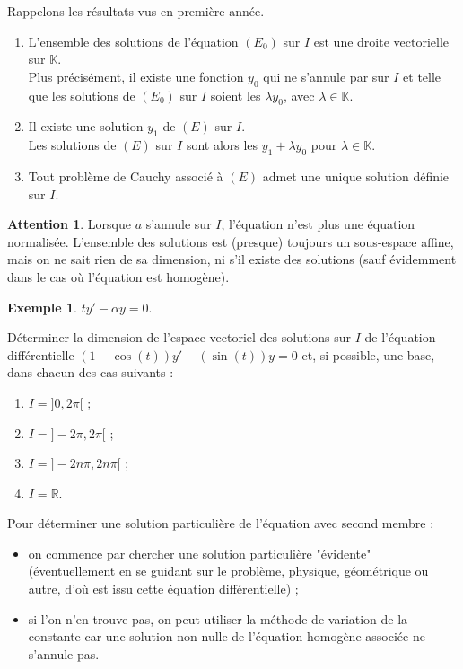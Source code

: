 \documentclass[french]{article}
\newcommand{\R}{\mathbb{R}}
\newcommand{\K}{\mathbb{K}}
\theoremstyle{plain}
\theoremstyle{definition}
\newtheorem*{ex}{Exemple}
\newtheorem*{attention}{Attention}
\theoremstyle{remark}
\begin{document}
Rappelons les résultats vus en première année.

\begin{prop}%
	\begin{enumerate}
		\item L'ensemble des solutions de l'équation $(E_0)$ sur $I$ est une droite vectorielle sur $\K$.\\
		Plus précisément, il existe une fonction $y_0$ qui ne s'annule par sur $I$ et telle que les solutions de $(E_0)$ sur $I$ soient les $\lambda y_0$, avec $\lambda\in\K$.
		\item Il existe une solution $y_1$ de $(E)$ sur $I$.\\
		Les solutions de $(E)$ sur $I$ sont alors les $y_1+\lambda y_0$ pour $\lambda\in\K$.
		\item Tout problème de Cauchy associé à $(E)$ admet une unique solution définie sur $I$.
	\end{enumerate}
\end{prop}

\begin{attention}
	Lorsque $a$ s'annule sur $I$, l'équation n'est plus une équation normalisée. L'ensemble des solutions est (presque) toujours un sous-espace affine, mais on ne sait rien de sa dimension, ni s'il existe des solutions (sauf évidemment dans le cas où l'équation est homogène).
\end{attention}

\begin{ex}
	$ty'-\alpha y=0$.
\end{ex}

\begin{exo}
	Déterminer la dimension de l'espace vectoriel des solutions sur $I$ de l'équation différentielle $(1-\cos(t))y'-(\sin(t))y=0$ et, si possible, une base, dans chacun des cas suivants :
	\begin{enumerate}
		\item $I=]0,2\pi[$ ;
		\item $I=]-2\pi,2\pi[$ ;
		\item $I=]-2n\pi,2n\pi[$ ;
		\item $I=\R$.
	\end{enumerate}
\end{exo}

\begin{met}
	Pour déterminer une solution particulière de l'équation avec second membre :
	\begin{itemize}
		\item on commence par chercher une solution particulière "évidente" (éventuellement en se guidant sur le problème, physique, géométrique ou autre, d'où est issu cette équation différentielle) ;
		\item si l'on n'en trouve pas, on peut utiliser la méthode de variation de la constante car une solution non nulle de l'équation homogène associée ne s'annule pas.
	\end{itemize}
\end{met}
\end{document}
